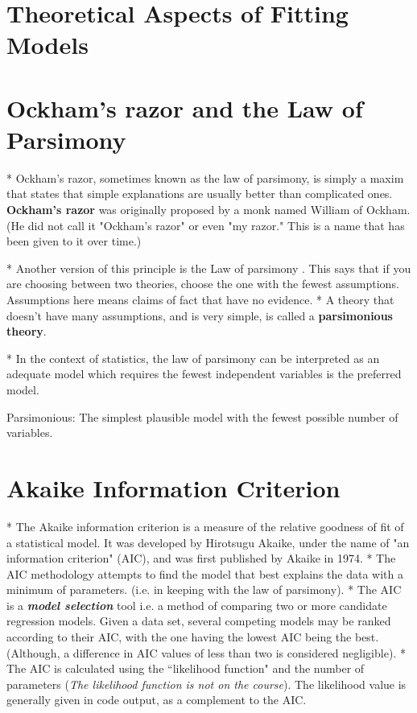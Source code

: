 


\section*{Theoretical Aspects of Fitting Models}

\section*{Ockham's razor and the Law of Parsimony}

*  Ockham's razor, sometimes known as the law of parsimony, is simply a maxim that states that simple explanations are usually better than complicated ones. \textbf{Ockham's razor} was originally proposed by a monk named William of Ockham. (He did not call it "Ockham's razor" or even "my razor." This is a name that has been given to it over time.)

*  Another version of this principle is the Law of parsimony . This says that if you are choosing between two theories, choose the one with the fewest assumptions. Assumptions here means claims of fact that have no evidence.
*  A theory that doesn't have many assumptions, and is very simple, is called a \textbf{parsimonious theory}.

*  In the context of statistics, the law of parsimony can be interpreted as an adequate model which requires the fewest independent variables is the preferred model.


\begin{framed}
Parsimonious: The simplest plausible model with the fewest possible number of variables.
\end{framed}




\section*{Akaike Information Criterion}

*  The Akaike information criterion is a measure of the relative goodness of fit of a statistical model. It was developed by Hirotsugu Akaike, under the name of "an information criterion" (AIC), and was first published by Akaike in 1974.
*  
The AIC methodology attempts to find the model that best explains the data with a minimum of parameters. (i.e. in keeping with the law of parsimony).
*  The AIC is a \textbf{\textit{model selection}} tool i.e. a method of comparing two
or more candidate regression models. Given a data set, several competing models may be ranked according to their AIC, with the one having the lowest AIC being the best. (Although, a difference in AIC values of less than two is considered negligible).
* 
The AIC is calculated using the ``likelihood function" and the number of parameters (\textit{The likelihood function is not on the course}). The likelihood value is generally given in code output, as a complement to the AIC.




